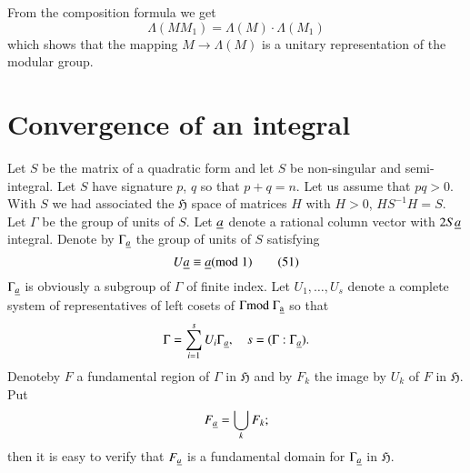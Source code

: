 From the composition formula we get
\begin{equation*}
\Lambda(MM_{1})=\Lambda(M)\cdot \Lambda(M_{1})\tag{50}\label{c4:eq50}
\end{equation*}
which shows that the mapping $M\to \Lambda(M)$ is a unitary
representation of the modular group.

\section{Convergence of an integral}\label{chap4:sec4}

Let $S$ be the matrix of a quadratic form and let $S$ be non-singular
and semi-integral. Let $S$ have signature $p$, $q$ so that
$p+q=n$. Let us assume that $pq>0$. With $S$ we had associated the
$\mathfrak{H}$ space of matrices $H$ with $H>0$, $HS^{-1}H=S$. Let
$\Gamma$ be the group of units of $S$. Let $\underline{a}$ denote a rational
column vector with $2S\underline{a}$ integral. Denote by $\Gamma_{\underline{a}}$
the group of units of $S$ satisfying
\begin{equation*}
U\underline{a}\equiv \underline{a}(\rm{mod} \; 1)\tag{51}\label{c4:eq51}
\end{equation*}
$\Gamma_{\underline{a}}$ is obviously a subgroup of $\Gamma$ of finite
index. Let $U_{1},\ldots,U_{s}$ denote a complete system of
representatives of left cosets of $\Gamma \rm{mod} \; \Gamma_{\underline{a}}$ so that
$$
\Gamma=\sum^{s}_{i=1}U_{i}\Gamma_{\underline{a}},\quad
s=(\Gamma:\Gamma_{\underline{a}}).
$$
Denote\pageoriginale by $F$ a fundamental region of $\Gamma$ in
$\mathfrak{H}$ and by $F_{k}$ the image by $U_{k}$ of $F$ in
$\mathfrak{H}$. Put
$$
F_{\underline{a}}=\bigcup_{k}F_{k};
$$
then it is easy to verify that $F_{\underline{a}}$ is a fundamental domain
for $\Gamma_{\underline{a}}$ in $\mathfrak{H}$.


